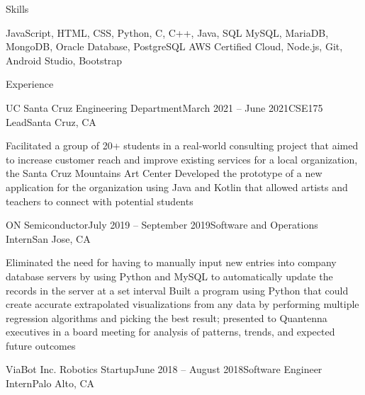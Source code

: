 \documentclass[]{cv_template}
\begin{document}
\begin{cv}
\begin{cvsection}{Skills}

\descitem[Languages] JavaScript, HTML, CSS, Python, C, C++, Java, SQL
\descitem[Databases] MySQL, MariaDB, MongoDB, Oracle Database, PostgreSQL
\descitem[Utilities] AWS Certified Cloud, Node.js, Git, Android Studio, Bootstrap

\end{cvsection}


\begin{cvsection}{Experience}


\begin{cvsubsection}
{UC Santa Cruz Engineering Department}{March 2021 -- June 2021}{CSE175 Lead}{Santa Cruz, CA}

\listitem Facilitated a group of 20+ students in a real-world consulting project that aimed to increase customer reach and improve existing services for a local organization, the Santa Cruz Mountains Art Center
\listitem Developed the prototype of a new application for the organization using Java and Kotlin that allowed artists and teachers to connect with potential students

\end{cvsubsection}


\begin{cvsubsection}
{ON Semiconductor}{July 2019 -- September 2019}{Software and Operations Intern}{San Jose, CA}

\listitem Eliminated the need for having to manually input new entries into company database servers by using Python and MySQL to automatically update the records in the server at a set interval
\listitem Built a program using Python that could create accurate extrapolated visualizations from any data by performing multiple regression algorithms and picking the best result; presented to Quantenna executives in a board meeting for analysis of patterns, trends, and expected future outcomes

\end{cvsubsection}


\begin{cvsubsection}
{ViaBot Inc. Robotics Startup}{June 2018 -- August 2018}{Software Engineer Intern}{Palo Alto, CA}


\end{cvsubsection}
\end{cvsection}
\end{cv}
\end{document}
